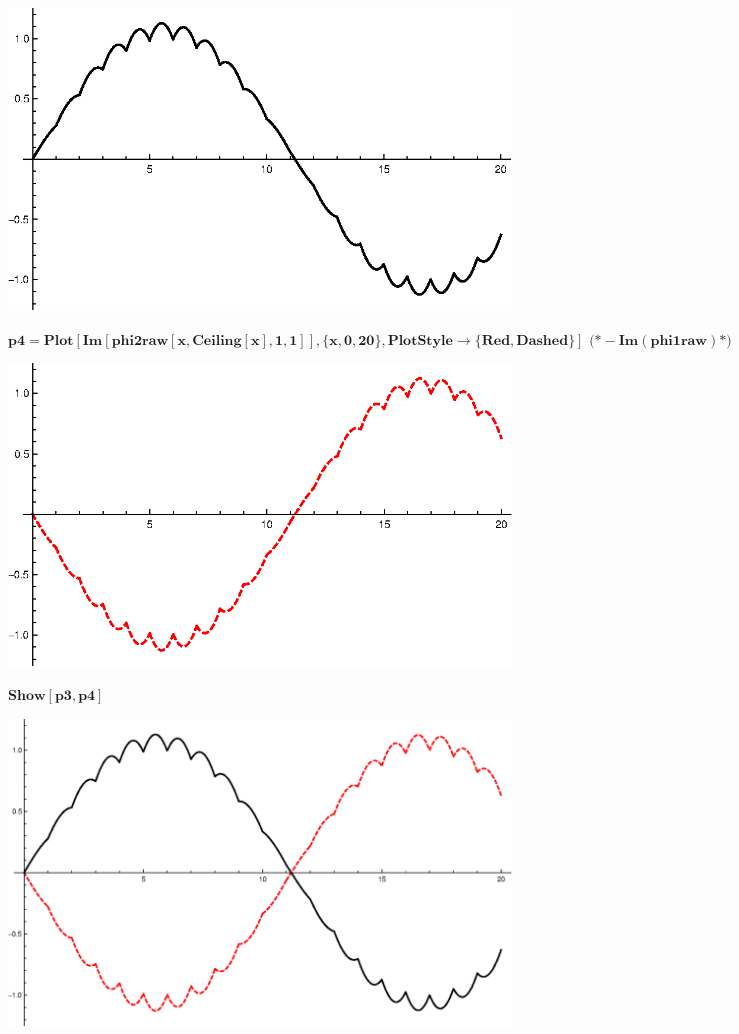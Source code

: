 {\includegraphics{chapters/appendices/KP_Mathematica/Kronig_Penney_model_transfer_matrix_gr25.eps}

\begin{doublespace}
\noindent\(\pmb{\text{p4}=\text{Plot}[\text{Im}[\text{phi2raw}[x,\text{Ceiling}[x],1,1]],\{x,0,20\},\text{PlotStyle}\to \{\text{Red},\text{Dashed}\}]\text{
 }\text{(*} -\text{Im}(\text{phi1raw}) \text{*)}}\)
\end{doublespace}

\includegraphics{chapters/appendices/KP_Mathematica/Kronig_Penney_model_transfer_matrix_gr26.eps}

\begin{doublespace}
\noindent\(\pmb{\text{Show}[\text{p3},\text{p4}]}\)
\end{doublespace}

\includegraphics{chapters/appendices/KP_Mathematica/Kronig_Penney_model_transfer_matrix_gr27.eps}

}
